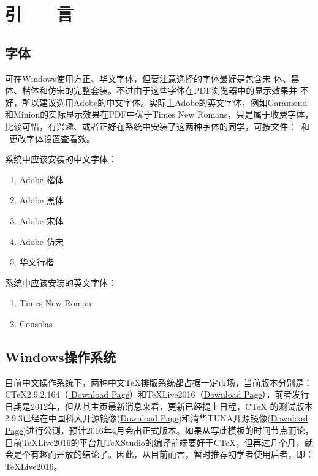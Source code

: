 \chapter*{\hfill 引　　言 \hfill}
\label{chap00}

\section{字体}

可在Windows使用方正、华文字体，但要注意选择的字体最好是包含宋
体、黑体、楷体和仿宋的完整套装。不过由于这些字体在PDF浏览器中的显示效果并
不好，所以建议选用Adobe的中文字体。实际上Adobe的英文字体，例如Garamond和Minion的实际显示效果在PDF中优于Times New Romans，只是属于收费字体，比较可惜，有兴趣、或者正好在系统中安装了这两种字体的同学，可按文件：~和
~更改字体设置查看效。

系统中应该安装的中文字体：
\begin{enumerate}
\item Adobe 楷体
\item Adobe 黑体
\item Adobe 宋体
\item Adobe 仿宋
\item 华文行楷
\end{enumerate}

系统中应该安装的英文字体：
\begin{enumerate}
\item Times New Roman
\item Consolas
\end{enumerate}

\section{Windows操作系统}

目前中文操作系统下，两种中文\TeX 排版系统都占据一定市场，当前版本分别是：C\TeX 2.9.2.164（\href{http://www.ctex.org/CTeXDownload}{
	Download Page}）和\TeX Live2016（\href{http://www.chinatex.org/?p=1323}{Download Page}），前者发行日期是2012年，但从其主页最新消息来看，更新已经提上日程，C\TeX{} 的测试版本2.9.3已经在中国科大开源镜像(\href{http://mirrors.ustc.edu.cn/ctex/unstable/}{Download Page})和清华TUNA开源镜像(\href{https://mirrors.tuna.tsinghua.edu.cn/ctex/unstable/}{Download Page})进行公测，预计2016年4月会出正式版本。如果从写此模板的时间节点而论，目前\TeX{}Live2016的平台加\TeX{}Studio的编译前端要好于C\TeX{}，但再过几个月，就会是个有趣而开放的结论了。因此，从目前而言，暂时推荐初学者使用后者，即：\TeX{}Live2016。

